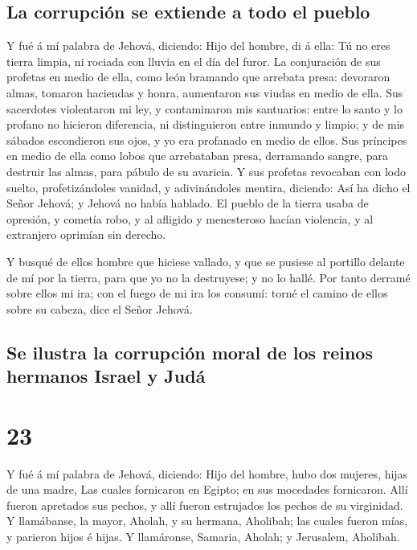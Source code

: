 \hypertarget{la-corrupciuxf3n-se-extiende-a-todo-el-pueblo}{%
\subsection{La corrupción se extiende a todo el
pueblo}\label{la-corrupciuxf3n-se-extiende-a-todo-el-pueblo}}

 Y fué á mí palabra de Jehová, diciendo: 
Hijo del hombre, di á ella: Tú no eres tierra limpia, ni rociada con
lluvia en el día del furor.  La conjuración de sus
profetas en medio de ella, como león bramando que arrebata presa:
devoraron almas, tomaron haciendas y honra, aumentaron sus viudas en
medio de ella.  Sus sacerdotes violentaron mi ley, y
contaminaron mis santuarios: entre lo santo y lo profano no hicieron
diferencia, ni distinguieron entre inmundo y limpio; y de mis sábados
escondieron sus ojos, y yo era profanado en medio de ellos.
 Sus príncipes en medio de ella como lobos que
arrebataban presa, derramando sangre, para destruir las almas, para
pábulo de su avaricia.  Y sus profetas revocaban con lodo
suelto, profetizándoles vanidad, y adivinándoles mentira, diciendo: Así
ha dicho el Señor Jehová; y Jehová no había hablado.  El
pueblo de la tierra usaba de opresión, y cometía robo, y al afligido y
menesteroso hacían violencia, y al extranjero oprimían sin derecho.

 Y busqué de ellos hombre que hiciese vallado, y que se
pusiese al portillo delante de mí por la tierra, para que yo no la
destruyese; y no lo hallé.  Por tanto derramé sobre ellos
mi ira; con el fuego de mi ira los consumí: torné el camino de ellos
sobre su cabeza, dice el Señor Jehová.

\hypertarget{se-ilustra-la-corrupciuxf3n-moral-de-los-reinos-hermanos-israel-y-juduxe1}{%
\subsection{Se ilustra la corrupción moral de los reinos hermanos Israel
y
Judá}\label{se-ilustra-la-corrupciuxf3n-moral-de-los-reinos-hermanos-israel-y-juduxe1}}

\hypertarget{section-26-23}{%
\section{23}\label{section-26-23}}

 Y fué á mí palabra de Jehová, diciendo: 
Hijo del hombre, hubo dos mujeres, hijas de una madre, 
Las cuales fornicaron en Egipto; en sus mocedades fornicaron. Allí
fueron apretados sus pechos, y allí fueron estrujados los pechos de su
virginidad.  Y llamábanse, la mayor, Aholah, y su hermana,
Aholibah; las cuales fueron mías, y parieron hijos é hijas. Y
llamáronse, Samaria, Aholah; y Jerusalem, Aholibah.

